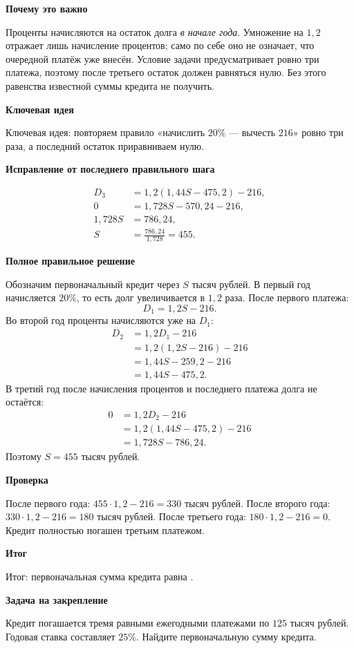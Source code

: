 \documentclass[12pt,a4paper]{article}
\newcommand{\subpart}[1]{\par\medskip\noindent\textbf{#1}\par\nobreak\smallskip}
\newcommand{\rate}{\text{ тыс. руб.}}
\begin{document}
\subpart{Почему это важно}
Проценты начисляются на остаток долга \emph{в начале года}.
Умножение на $1{,}2$ отражает лишь начисление процентов;
само по себе оно не означает, что очередной платёж уже внесён.
Условие задачи предусматривает ровно три платежа, поэтому после
третьего остаток должен равняться нулю. Без этого равенства
известной суммы кредита не получить.

\subpart{Ключевая идея}
\textcolor{blue!60!black}{Ключевая идея:} повторяем правило
«начислить $20\%$ --- вычесть $216$» ровно три раза, а последний
остаток приравниваем нулю.

\subpart{Исправление от последнего правильного шага}
\begin{align*}
D_3&=1{,}2(1{,}44S-475{,}2)-216,\\
0&=1{,}728S-570{,}24-216,\\
1{,}728S&=786{,}24,\\
S&=\frac{786{,}24}{1{,}728}=455.
\end{align*}

\subpart{Полное правильное решение}
Обозначим первоначальный кредит через $S$ тысяч рублей.
В первый год начисляется $20\%$, то есть долг увеличивается
в $1{,}2$ раза. После первого платежа:
\[
D_1=1{,}2S-216.
\]
Во второй год проценты начисляются уже на $D_1$:
\begin{align*}
D_2&=1{,}2D_1-216\\
   &=1{,}2(1{,}2S-216)-216\\
   &=1{,}44S-259{,}2-216\\
   &=1{,}44S-475{,}2.
\end{align*}
В третий год после начисления процентов и последнего платежа
долга не остаётся:
\begin{align*}
0&=1{,}2D_2-216\\
 &=1{,}2(1{,}44S-475{,}2)-216\\
 &=1{,}728S-786{,}24.
\end{align*}
Поэтому $S=455$ тысяч рублей.

\subpart{Проверка}
После первого года: $455\cdot1{,}2-216=330$ тысяч рублей.
После второго года: $330\cdot1{,}2-216=180$ тысяч рублей.
После третьего года: $180\cdot1{,}2-216=0$.
Кредит полностью погашен третьим платежом.

\subpart{Итог}
\textcolor{teal!60!black}{Итог:} первоначальная сумма кредита равна
\boxed{455\rate}.

\subpart{Задача на закрепление}
Кредит погашается тремя равными ежегодными платежами по $125$ тысяч рублей.
Годовая ставка составляет $25\%$. Найдите первоначальную сумму кредита.
\end{document}
